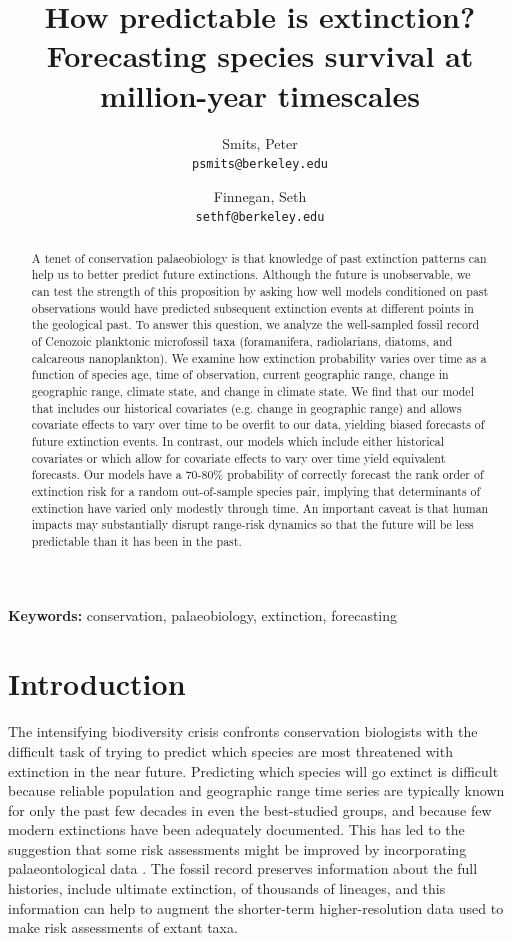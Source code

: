 \documentclass[12pt,letterpaper]{article}
\title{How predictable is extinction? Forecasting species survival at million-year timescales}
\author{
 Smits, Peter\\
 \texttt{psmits@berkeley.edu} 
 \and
 Finnegan, Seth\\
 \texttt{sethf@berkeley.edu}
}
\date{}
\begin{document}
\begin{refsection}

\maketitle

\linenumbers{}
\modulolinenumbers[3]

\begin{abstract}
  A tenet of conservation palaeobiology is that knowledge of past extinction patterns can help us to better predict future extinctions. Although the future is unobservable, we can test the strength of this proposition by asking how well models conditioned on past observations would have predicted subsequent extinction events at different points in the geological past. To answer this question, we analyze the well-sampled fossil record of Cenozoic planktonic microfossil taxa (foramanifera, radiolarians, diatoms, and calcareous nanoplankton). We examine how extinction probability varies over time as a function of species age, time of observation, current geographic range, change in geographic range, climate state, and change in climate state. We find that our model that includes our historical covariates (e.g. change in geographic range) and allows covariate effects to vary over time to be overfit to our data, yielding biased forecasts of future extinction events. In contrast, our models which include either historical covariates or which allow for covariate effects to vary over time yield equivalent forecasts. Our models have a 70-80\% probability of correctly forecast the rank order of extinction risk for a random out-of-sample species pair, implying that determinants of extinction have varied only modestly through time. An important caveat is that human impacts may substantially disrupt range-risk dynamics so that the future will be less predictable than it has been in the past.

\end{abstract}

{\bf Keywords:} conservation, palaeobiology, extinction, forecasting



\section{Introduction}

The intensifying biodiversity crisis confronts conservation biologists with the difficult task of trying to predict which species are most threatened with extinction in the near future. Predicting which species will go extinct is difficult because reliable population and geographic range time series are typically known for only the past few decades in even the best-studied groups, and because few modern extinctions have been adequately documented. This has led to the suggestion that some risk assessments might be improved by incorporating palaeontological data \citep{Finnegan2015,Kiessling2016}. The fossil record preserves information about the full histories, include ultimate extinction, of thousands of lineages, and this information can help to augment the shorter-term higher-resolution data used to make risk assessments of extant taxa.


\end{refsection}
\end{document}
